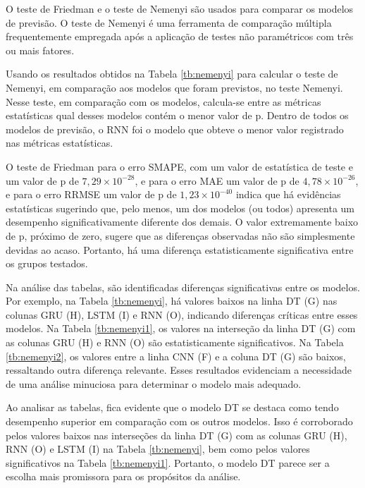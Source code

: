 O teste de Friedman e o teste de Nemenyi são usados para comparar os modelos de previsão. O teste de Nemenyi é uma ferramenta de comparação múltipla frequentemente empregada após a aplicação de testes não paramétricos com três ou mais fatores.

Usando os resultados obtidos na Tabela \ref{tb:nemenyi} para calcular o teste de Nemenyi, em comparação aos modelos que foram previstos, no teste Nemenyi. Nesse teste, em comparação com os modelos, calcula-se entre as métricas estatísticas qual desses modelos contém o menor valor de p. Dentro de todos os modelos de previsão, o RNN foi o modelo que obteve o menor valor registrado nas métricas estatísticas.

O teste de Friedman para o erro SMAPE, com um valor de estatística de teste e um valor de p de $7,29 \times 10^{-28}$, e para o erro MAE um valor de p de $4,78 \times 10^{-26}$, e para o erro RRMSE um valor de p de $1,23 \times 10^{-40}$ indica que há evidências estatísticas sugerindo que, pelo menos, um dos modelos (ou todos) apresenta um desempenho significativamente diferente dos demais. O valor extremamente baixo de p, próximo de zero, sugere que as diferenças observadas não são simplesmente devidas ao acaso. Portanto, há uma diferença estatisticamente significativa entre os grupos testados.


Na análise das tabelas, são identificadas diferenças significativas entre os modelos. Por exemplo, na Tabela \ref{tb:nemenyi}, há valores baixos na linha DT (G) nas colunas GRU (H), LSTM (I) e RNN (O), indicando diferenças críticas entre esses modelos. Na Tabela \ref{tb:nemenyi1}, os valores na interseção da linha DT (G) com as colunas GRU (H) e RNN (O) são estatisticamente significativos. Na Tabela \ref{tb:nemenyi2}, os valores entre a linha CNN (F) e a coluna DT (G) são baixos, ressaltando outra diferença relevante. Esses resultados evidenciam a necessidade de uma análise minuciosa para determinar o modelo mais adequado.

Ao analisar as tabelas, fica evidente que o modelo DT se destaca como tendo desempenho superior em comparação com os outros modelos. Isso é corroborado pelos valores baixos nas interseções da linha DT (G) com as colunas GRU (H), RNN (O) e LSTM (I) na Tabela \ref{tb:nemenyi}, bem como pelos valores significativos na Tabela \ref{tb:nemenyi1}. Portanto, o modelo DT parece ser a escolha mais promissora para os propósitos da análise.




